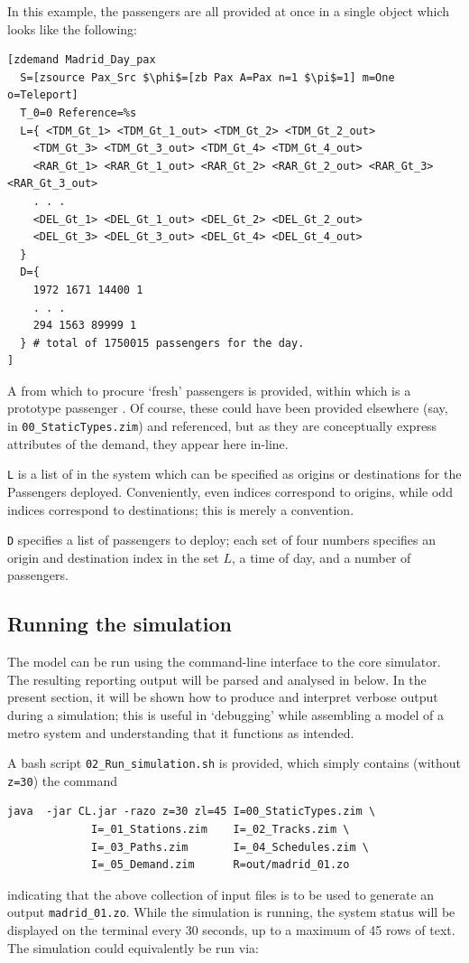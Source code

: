 In this example, the passengers are all provided at once in a single  object which looks like the following:
\begin{lstlisting}[mathescape]
[zdemand Madrid_Day_pax
  S=[zsource Pax_Src $\phi$=[zb Pax A=Pax n=1 $\pi$=1] m=One o=Teleport]
  T_0=0 Reference=%s
  L={ <TDM_Gt_1> <TDM_Gt_1_out> <TDM_Gt_2> <TDM_Gt_2_out>
    <TDM_Gt_3> <TDM_Gt_3_out> <TDM_Gt_4> <TDM_Gt_4_out>
    <RAR_Gt_1> <RAR_Gt_1_out> <RAR_Gt_2> <RAR_Gt_2_out> <RAR_Gt_3> <RAR_Gt_3_out>
    . . . 
    <DEL_Gt_1> <DEL_Gt_1_out> <DEL_Gt_2> <DEL_Gt_2_out>
    <DEL_Gt_3> <DEL_Gt_3_out> <DEL_Gt_4> <DEL_Gt_4_out>
  }
  D={ 
    1972 1671 14400 1
    . . .
    294 1563 89999 1
  } # total of 1750015 passengers for the day.
]
\end{lstlisting}
A  from which to procure `fresh' passengers is provided,
within which is a prototype passenger .  Of course, these
could have been provided elsewhere (say, in {\tt 00\_StaticTypes.zim})
and referenced, but as they are conceptually express attributes of the
demand, they appear here in-line.

{\tt L} is a list of  in the system which can be specified as origins or destinations
for the Passengers deployed. Conveniently, even indices correspond to origins, while odd indices
correspond to destinations; this is merely a convention.

{\tt D} specifies a list of passengers to deploy; each set of four numbers
specifies an origin and destination index in the set $L$, a time of
day, and a number of passengers.

\subsection{Running the simulation}

The model can be run using the command-line interface to the core
simulator.  The resulting reporting output will be parsed and analysed
in  below. In the present section, it will be
shown how to produce and interpret verbose output during a simulation;
this is useful in `debugging' while assembling a model of a metro
system and understanding that it functions as intended.

A bash script {\tt 02\_Run\_simulation.sh} is provided, which simply contains (without {\tt z=30}) the command
\begin{lstlisting}[mathescape]
java  -jar CL.jar -razo z=30 zl=45 I=00_StaticTypes.zim \
             I=_01_Stations.zim    I=_02_Tracks.zim \
             I=_03_Paths.zim       I=_04_Schedules.zim \
             I=_05_Demand.zim      R=out/madrid_01.zo
\end{lstlisting}
indicating that the above collection of input files is to be used to generate an output { \tt madrid\_01.zo}.
While the simulation is running, the system status will be displayed on the terminal every 30 seconds,
up to a maximum of 45 rows of text.
The simulation could equivalently be run via: \\
\comline{./02\_Run\_Simulation.sh z=30}

